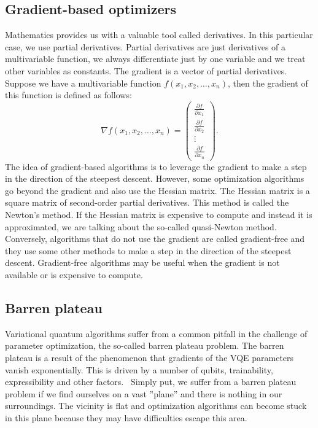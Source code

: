 \subsection{Gradient-based optimizers}
Mathematics provides us with a valuable tool called derivatives. In this particular case, we use partial derivatives. Partial derivatives are just derivatives of a multivariable function, we always differentiate just by one variable and we treat other variables as constants. The gradient is a vector of partial derivatives. Suppose we have a multivariable function $f(x_1, x_2, \ldots, x_n)$, then the gradient of this function is defined as follows:
$$\nabla f(x_1, x_2, \ldots, x_n) =  \begin{pmatrix} \frac{\partial f}{\partial x_1} \\ \frac{\partial f}{\partial x_2} \\ \vdots \\ \frac{\partial f}{\partial x_n}\end{pmatrix} \text{.}$$
The idea of gradient-based algorithms is to leverage the gradient to make a step in the direction of the steepest descent. However, some optimization algorithms go beyond the gradient and also use the Hessian matrix. The Hessian matrix is a square matrix of second-order partial derivatives. This method is called the Newton's method. If the Hessian matrix is expensive to compute and instead it is approximated, we are talking about the so-called quasi-Newton method. Conversely, algorithms that do not use the gradient are called gradient-free and they use some other methods to make a step in the direction of the steepest descent. Gradient-free algorithms may be useful when the gradient is not available or is expensive to compute.


\subsection{Barren plateau}
Variational quantum algorithms suffer from a common pitfall in the challenge of parameter optimization, the so-called barren plateau problem. The barren plateau is a result of the phenomenon that gradients of the VQE parameters vanish exponentially. This is driven by a number of qubits, trainability, expressibility and other factors.~\cite{fedorov2021vqe} Simply put, we suffer from a barren plateau problem if we find ourselves on a vast ''plane'' and there is nothing in our surroundings. The vicinity is flat and optimization algorithms can become stuck in this plane because they may have difficulties escape this area.
